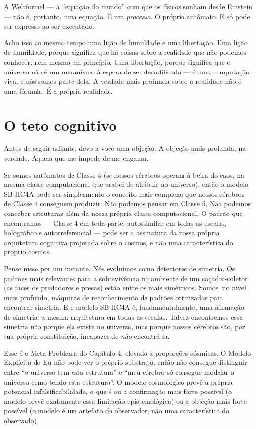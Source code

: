 \documentclass[11pt, twoside, openright]{book}
\begin{document}
A Weltformel --- a ``equação do mundo'' com que os físicos sonham desde Einstein --- não é, portanto, uma equação. É um \textit{processo}. O próprio autômato. E só pode ser expresso ao ser executado.

Acho isso ao mesmo tempo uma lição de humildade e uma libertação. Uma lição de humildade, porque significa que há coisas sobre a realidade que não podemos conhecer, nem mesmo em princípio. Uma libertação, porque significa que o universo não é um mecanismo à espera de ser decodificado --- é uma computação viva, e nós somos parte dela. A verdade mais profunda sobre a realidade não é uma fórmula. É a própria realidade.


\section*{O teto cognitivo}

Antes de seguir adiante, devo a você uma objeção. A objeção mais profunda, na verdade. Aquela que me impede de me enganar.

Se somos autômatos de Classe 4 (se nossos cérebros operam à beira do caos, na mesma classe computacional que acabei de atribuir ao universo), então o modelo SB-HC4A pode ser simplesmente o conceito mais complexo que nossos cérebros de Classe 4 conseguem produzir. Não podemos pensar em Classe 5. Não podemos conceber estruturas além da nossa própria classe computacional. O padrão que encontramos --- Classe 4 em toda parte, autossimilar em todas as escalas, holográfico e autorreferencial --- pode ser a assinatura da nossa própria arquitetura cognitiva projetada sobre o cosmos, e não uma característica do próprio cosmos.

Pense nisso por um instante. Nós evoluímos como detectores de simetria. Os padrões mais relevantes para a sobrevivência no ambiente de um caçador-coletor (as faces de predadores e presas) estão entre os mais simétricos. Somos, no nível mais profundo, máquinas de reconhecimento de padrões otimizadas para encontrar simetria. E o modelo SB-HC4A é, fundamentalmente, uma afirmação de simetria: a mesma arquitetura em todas as escalas. Talvez encontremos essa simetria não porque ela existe no universo, mas porque nossos cérebros são, por sua própria constituição, incapazes de \textit{não} encontrá-la.

Esse é o Meta-Problema do Capítulo 4, elevado a proporções cósmicas. O Modelo Explícito do Eu não pode ver o próprio substrato, então não consegue distinguir entre ``o universo tem esta estrutura'' e ``meu cérebro só consegue modelar o universo como tendo esta estrutura''. O modelo cosmológico prevê a própria potencial infalsificabilidade, o que é ou a confirmação mais forte possível (o modelo prevê exatamente essa limitação epistemológica) ou a objeção mais forte possível (o modelo é um artefato do observador, não uma característica do observado).
\end{document}
